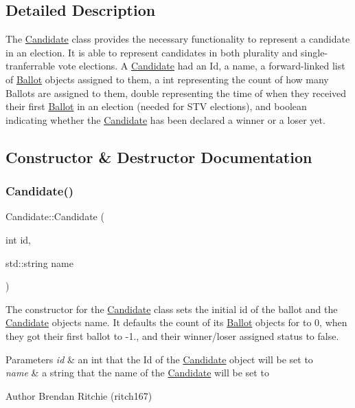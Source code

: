 \subsection{Detailed Description}
The \hyperlink{classCandidate}{Candidate} class provides the necessary functionality to represent a candidate in an election. It is able to represent candidates in both plurality and single-\/tranferrable vote elections. A \hyperlink{classCandidate}{Candidate} had an Id, a name, a forward-\/linked list of \hyperlink{classBallot}{Ballot} objects assigned to them, a int representing the count of how many Ballots are assigned to them, double representing the time of when they received their first \hyperlink{classBallot}{Ballot} in an election (needed for S\+TV elections), and boolean indicating whether the \hyperlink{classCandidate}{Candidate} has been declared a winner or a loser yet. 

\subsection{Constructor \& Destructor Documentation}
\mbox{\label{classCandidate_a58b3815b3b93c161c47165e3725b704a}} 
\subsubsection{\texorpdfstring{Candidate()}{Candidate()}}
{\footnotesize\ttfamily Candidate\+::\+Candidate (\begin{DoxyParamCaption}\item[{int}]{id,  }\item[{std\+::string}]{name }\end{DoxyParamCaption})}

The constructor for the \hyperlink{classCandidate}{Candidate} class sets the initial id of the ballot and the \hyperlink{classCandidate}{Candidate} object\textquotesingle{}s name. It defaults the count of its \hyperlink{classBallot}{Ballot} objects for to 0, when they got their first ballot to -\/1., and their winner/loser assigned status to false. 
\begin{DoxyParams}{Parameters}
{\em id} & an int that the Id of the \hyperlink{classCandidate}{Candidate} object will be set to \\
\hline
{\em name} & a string that the name of the \hyperlink{classCandidate}{Candidate} will be set to \\
\hline
\end{DoxyParams}
\begin{DoxyAuthor}{Author}
Brendan Ritchie (ritch167) 
\end{DoxyAuthor}



